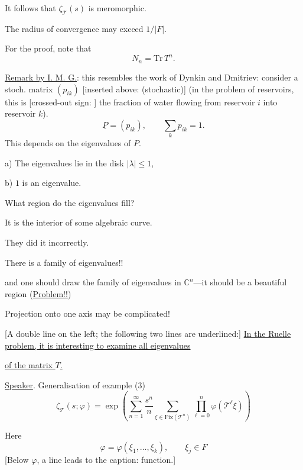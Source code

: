 It follows that $\zeta_{\mathcal T}(s)$ is meromorphic.

The radius of convergence may exceed $1/|F|$.

For the proof, note that
\begin{equation}
 N_n=\mathrm{Tr}\,T^n.
 \tag{6}
\end{equation}


\underline{Remark by I. M. G.}: this resembles the work of Dynkin and Dmitriev:
consider a stoch. matrix $(p_{ik})$ [inserted above: (stochastic)]
(in the problem of reservoirs, this is
[crossed-out sign: ]
the fraction of water flowing from reservoir $i$ into reservoir $k$).
\begin{equation*}
 \underline{P}=(p_{ik}),\qquad \sum_k p_{ik}=1.
\end{equation*}
This depends on the eigenvalues of $P$.

a) The eigenvalues lie in the disk $|\lambda|\leq1$,

b) $1$ is an eigenvalue.

What region do the eigenvalues fill?

It is the interior of some algebraic curve.

They did it incorrectly.

There is a family of eigenvalues!!

and one should draw the family of eigenvalues in $\mathbb C^n$---it should
be a beautiful region (\underline{Problem!!})

Projection onto one axis may be complicated!

[A double line on the left; the following two lines are underlined:]
\underline{In the Ruelle problem, it is interesting to examine all eigenvalues}

\underline{of the matrix $T$.}

\medskip
\underline{Speaker}. Generalisation of example (3)
\begin{equation}
 \zeta_{\mathcal T}(s;\varphi)=
 \exp\left(
 \sum_{n=1}^{\infty}\frac{s^n}{n}
 \sum_{\xi\in\mathrm{Fix}(\mathcal T^n)}
 \prod_{\ell=0}^{n}\varphi(\mathcal T^\ell\xi)
 \right)
 \tag{7}
\end{equation}

Here
\begin{equation*}
 \varphi=\varphi(\xi_1,\ldots,\xi_k),\qquad \xi_j\in F
\end{equation*}
[Below $\varphi$, a line leads to the caption: function.]

